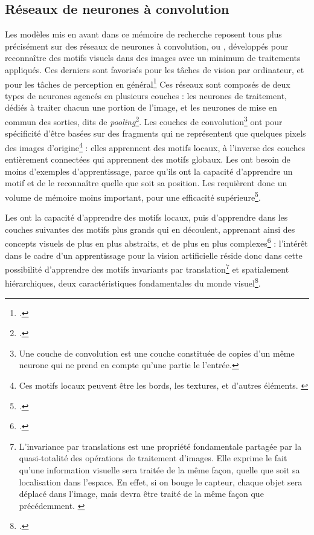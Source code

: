     \subsection{Réseaux de neurones à convolution}
    Les modèles mis en avant dans ce mémoire de recherche reposent tous plus précisément sur des réseaux de neurones à convolution, ou \cnn, développés pour reconnaître des motifs visuels dans des images avec un minimum de traitements appliqués. Ces derniers sont favorisés pour les tâches de vision par ordinateur, et pour les tâches de perception en général\footcite{cholletApprentissageProfondAvec2020a} Ces réseaux sont composés de deux types de neurones agencés en plusieurs couches : les neurones de traitement, dédiés à traiter chacun une portion de l'image, et les neurones de mise en commun des sorties, dits de \textit{pooling}\footcite{goodfellowDeepLearning2016}. Les couches de convolution\footnote{Une couche de convolution est une couche constituée de copies d'un même neurone qui ne prend en compte qu'une partie le l'entrée.} ont pour spécificité d'être basées sur des fragments qui ne représentent que quelques pixels des images d'origine\footnote{Ces motifs locaux peuvent être les bords, les textures, et d'autres éléments. \cite{cholletApprentissageProfondAvec2020a}} : elles apprennent des motifs locaux, à l'inverse des couches entièrement connectées qui apprennent des motifs globaux. Les \cnn ont besoin de moins d'exemples d'apprentissage, parce qu'ils ont la capacité d'apprendre un motif et de le reconnaître quelle que soit sa position. Les \cnn requièrent donc un volume de mémoire moins important, pour une efficacité supérieure\footcite{goodfellowDeepLearning2016}. 
    
    Les \cnn ont la capacité d'apprendre des motifs locaux, puis d'apprendre dans les couches suivantes des motifs plus grands qui en découlent, apprenant ainsi des concepts visuels de plus en plus abstraits, et de plus en plus complexes\footcite{cholletApprentissageProfondAvec2020a} : l'intérêt dans le cadre d'un apprentissage pour la vision artificielle réside donc dans cette possibilité d'apprendre des motifs invariants par translation\footnote{\og  L'invariance par translations est une propriété fondamentale partagée par la quasi-totalité des opérations de traitement d'images. Elle exprime le fait qu'une information visuelle sera traitée de la même façon, quelle que soit sa localisation dans l'espace. En effet, si on bouge le capteur, chaque objet sera déplacé dans l'image, mais devra être traité de la même façon que précédemment. \fg \cite{ronseInvarianceParTranslations}} et spatialement hiérarchiques, deux caractéristiques fondamentales du monde visuel\footcite{cholletApprentissageProfondAvec2020a}.

